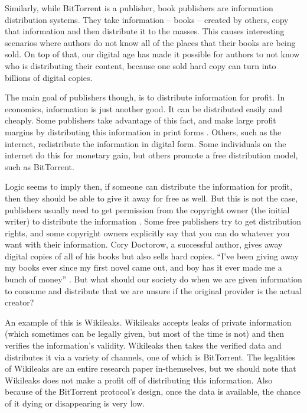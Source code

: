 \documentclass[11pt]{article}
\begin{document}
\begin{multicols}{2}
Similarly, while BitTorrent is a publisher, book publishers are information distribution systems. They take information -- books -- created by others, copy that information and then distribute it to the masses. This causes interesting scenarios where authors do not know all of the places that their books are being sold. On top of that, our digital age has made it possible for authors to not know who is distributing their content, because one sold hard copy can turn into billions of digital copies.

The main goal of publishers though, is to distribute information for profit. In economics, information is just another good. It can be distributed easily and cheaply. Some publishers take advantage of this fact, and make large profit margins by distributing this information in print forms \cite{PSO}. Others, such as the internet, redistribute the information in digital form. Some individuals on the internet do this for monetary gain, but others promote a free distribution model, such as BitTorrent.

Logic seems to imply then, if someone can distribute the information for profit, then they should be able to give it away for free as well. But this is not the case, publishers usually need to get permission from the copyright owner (the initial writer) to distribute the information \cite{t17c1s106}. Some free publishers try to get distribution rights, and some copyright owners explicitly say that you can do whatever you want with their information. Cory Doctorow, a successful author, gives away digital copies of all of his books but also sells hard copies. ``I've been giving away my books ever since my first novel came out, and boy has it ever made me a bunch of money'' \cite{doctorow}. But what should our society do when we are given information to consume and distribute that we are unsure if the original provider is the actual creator?

An example of this is Wikileaks. Wikileaks accepts leaks of private information (which sometimes can be legally given, but most of the time is not) and then verifies the information's validity. Wikileaks then takes the verified data and distributes it via a variety of channels, one of which is BitTorrent. The legalities of Wikileaks are an entire research paper in-themselves, but we should note that Wikileaks does not make a profit off of distributing this information. Also because of the BitTorrent protocol's design, once the data is available, the chance of it dying or disappearing is very low.


\end{multicols}
\end{document}
